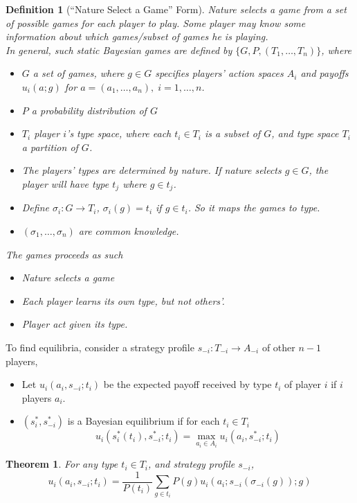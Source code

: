 \documentclass[12pt]{article}
\newtheorem{definition}{Definition}[section]
\newtheorem{theorem}{Theorem}[section]
\theoremstyle{definition}
\begin{document}
\begin{definition}[``Nature Select a Game'' Form]
\normalfont Nature selects a game from a set of possible games for each player to play. Some player may know some information about which games/subset of games he is playing.\\
In general, such static Bayesian games are defined by $\{G,P,(T_1,\ldots, T_n)\}$, where
\begin{itemize}
  \item $G$ a set of games, where $g\in G$ specifies players' action spaces $A_i$ and payoffs $u_i(a;g)$ for $a=(a_1,\ldots, a_n), \;i=1,\ldots, n$.
  \item $P$ a probability distribution of $G$
  \item $T_i$ player $i$'s type space, where each $t_i\in T_i$ is a subset of $G$, and type space $T_i$ a partition of $G$.
  \item The players' types are determined by nature. If nature selects $g\in G$, the player will have type $t_j$ where $g\in t_j$.
  \item Define $\sigma_i:G\to T_i$, $\sigma_i(g)=t_i$ if $g\in t_i$. So it maps the games to type.
  \item $(\sigma_1,\ldots, \sigma_n)$ are common knowledge.
\end{itemize}
The games proceeds as such
\begin{itemize}
  \item Nature selects a game
  \item Each player learns its own type, but not others'.
  \item Player act given its type.
\end{itemize}
\end{definition}
To find equilibria, consider a strategy profile $s_{-i}:T_{-i}\to A_{-i}$ of other $n-1$ players,
\begin{itemize}
  \item Let $u_i(a_i,s_{-i}; t_i)$ be the expected payoff received by type $t_i$ of player $i$ if $i$ players $a_i$.
  \item $(s_i^\ast, s_{-i}^\ast)$ is a Bayesian equilibrium if for each $t_i\in T_i$
  \[
u_i(s_i^\ast(t_i), s_{-i}^\ast; t_i) = \max_{a_i\in A_i} u_i(a_i, s_{-i}^\ast; t_i)
  \]
\end{itemize}
\begin{theorem}\normalfont For any type $t_i\in T_i$, and strategy profile $s_{-i}$, 
\[
u_i(a_i,s_{-i}; t_i) =\frac{1}{P(t_i)}\sum_{g\in t_i}P(g)u_i(a_i; s_{-i}(\sigma_{-i}(g));g)
\]
\end{theorem}
\end{document}
